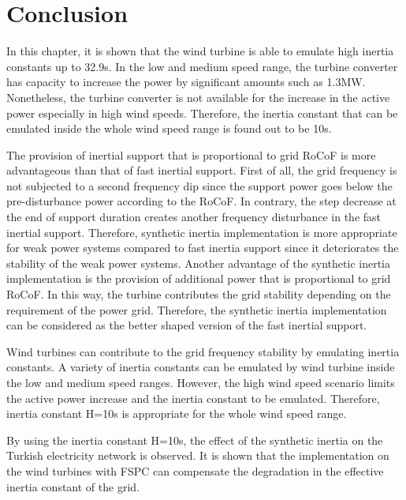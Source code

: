 \section{Conclusion}
In this chapter, it is shown that the wind turbine is able to emulate high inertia constants up to 32.9s. In the low and medium speed range, the turbine converter has capacity to increase the power by significant amounts such as 1.3MW. Nonetheless, the turbine converter is not available for the increase in the active power especially in high wind speeds. Therefore, the inertia constant that can be emulated inside the whole wind speed range is found out to be 10s. \par
The provision of inertial support that is proportional to grid RoCoF is more advantageous than that of fast inertial support. First of all, the grid frequency is not subjected to a second frequency dip since the support power goes below the pre-disturbance power according to the RoCoF. In contrary, the step decrease at the end of support duration creates another frequency disturbance in the fast inertial support. Therefore, synthetic inertia implementation is more appropriate for weak power systems compared to fast inertia support since it deteriorates the stability of the weak power systems. Another advantage of the synthetic inertia implementation is the provision of additional power that is proportional to grid RoCoF. In this way, the turbine contributes the grid stability depending on the requirement of the power grid. Therefore, the synthetic inertia implementation can be considered as the better shaped version of the fast inertial support.\par
Wind turbines can contribute to the grid frequency stability by emulating inertia constants. A variety of inertia constants can be emulated by wind turbine inside the low and medium speed ranges. However, the high wind speed scenario limits the active power increase and the inertia constant to be emulated. Therefore, inertia constant H=10s is appropriate for the whole wind speed range.\par
By using the inertia constant H=10s, the effect of the synthetic inertia on the Turkish electricity network is observed. It is shown that the implementation on the wind turbines with FSPC can compensate the degradation in the effective inertia constant of the grid.